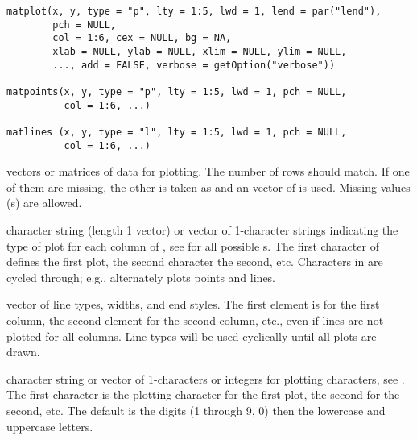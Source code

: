 %
\begin{Usage}
\begin{verbatim}
matplot(x, y, type = "p", lty = 1:5, lwd = 1, lend = par("lend"),
        pch = NULL,
        col = 1:6, cex = NULL, bg = NA,
        xlab = NULL, ylab = NULL, xlim = NULL, ylim = NULL,
        ..., add = FALSE, verbose = getOption("verbose"))

matpoints(x, y, type = "p", lty = 1:5, lwd = 1, pch = NULL,
          col = 1:6, ...)

matlines (x, y, type = "l", lty = 1:5, lwd = 1, pch = NULL,
          col = 1:6, ...)
\end{verbatim}
\end{Usage}
%
\begin{Arguments}
\begin{ldescription}
\item[\code{x,y}] vectors or matrices of data for plotting.  The number of
rows should match.  If one of them are missing, the other is taken
as  and an  vector of  is used.
Missing values (s) are allowed.
\item[\code{type}] character string (length 1 vector) or vector of 1-character
strings indicating the type of plot for each
column of , see  for all possible
s.  The first character of 
defines the first plot, the second character the second, etc.
Characters in  are cycled through; e.g., 
alternately plots points and lines.
\item[\code{lty,lwd,lend}] vector of line types, widths, and end styles.
The first element is for the first column, the second element for
the second column, etc., even if lines are not plotted for all
columns. Line types will be used cyclically until all plots are
drawn.
\item[\code{pch}] character string or vector of 1-characters or integers for
plotting characters, see .
The first character is the plotting-character for the first plot,
the second for the second, etc.  The default is the digits (1
through 9, 0) then the lowercase and uppercase letters.







\end{ldescription}
\end{Arguments}
